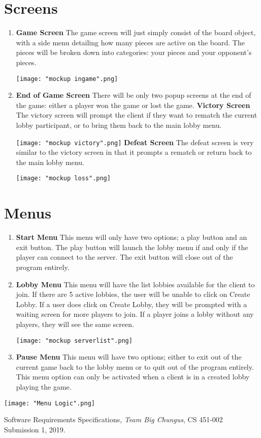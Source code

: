 \documentclass{scrreprt}
\begin{document}
	\section{Screens}
		\begin{enumerate} [label*=\arabic*.]
		\item \textbf{Game Screen}
				The game screen will just simply consist of the board object, with a side menu detailing how many pieces are active on the board. The pieces will be broken down into categories: your pieces and your opponent's pieces.
				
\texttt{[image: "mockup ingame".png]}
		\item \textbf{End of Game Screen}
			There will be only two popup screens at the end of the game: either a player won the game or lost the game. 
			\subitem \textbf{Victory Screen}
				The victory screen will prompt the client if they want to rematch the current lobby participant, or to bring them back to the main lobby menu.
				
				\texttt{[image: "mockup victory".png]}
			\subitem \textbf{Defeat Screen}
				The defeat screen is very similar to the victory screen in that it prompts a rematch or return back to the main lobby menu.

				\texttt{[image: "mockup loss".png]}
		\end{enumerate}

	\section{Menus}
		\begin{enumerate} [label*=\arabic*.]
		\item \textbf{Start Menu}
			This menu will only have two options; a play button and an exit button. The play button will launch the lobby menu if and only if the player can connect to the server. The exit button will close out of the program entirely. 

		\item \textbf{Lobby Menu}
			This menu will have the list lobbies available for the client to join. If there are 5 active lobbies, the user will be unable to click on Create Lobby. If a user does click on Create Lobby, they will be prompted with a waiting screen for more players to join. If a player joins a lobby without any players, they will see the same screen.

\texttt{[image: "mockup serverlist".png]}

		\item \textbf{Pause Menu}
			This menu will have two options; either to exit out of the current game back to the lobby menu or to quit out of the program entirely. This menu option can only be activated when a client is in a created lobby playing the game.
		\end{enumerate}

		\texttt{[image: "Menu Logic".png]}

\begin{thebibliography}{9}

  Software Requirements Specifications,
  \textit{Team Big Chungus},
  CS 451-002 Submission 1,
  2019.

\end{thebibliography}
\end{document}
